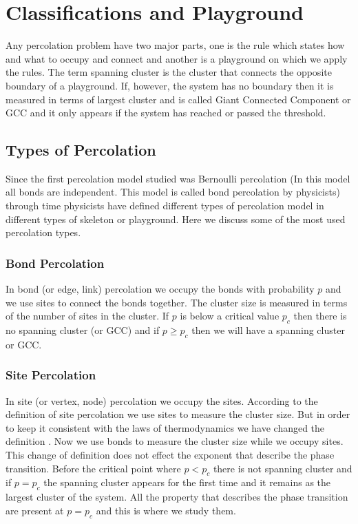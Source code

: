 \section{Classifications and Playground}
	Any percolation problem have two major parts, one is the rule which states how and what to occupy and connect and another is a playground on which we apply the rules. The term spanning cluster is the cluster that connects the opposite boundary of a playground. If, however, the system has no boundary then it is measured in terms of largest cluster and is called Giant Connected Component or GCC and it only appears if the system has reached or passed the threshold. 
		
	\subsection{Types of Percolation}
		Since the first percolation model studied was Bernoulli percolation (In this model all bonds are independent. This model is called bond percolation by physicists) through time physicists have defined different types of percolation model in different types of skeleton or playground. Here we discuss some of the most used percolation types.
		
		\subsubsection{Bond Percolation}
			In bond (or edge, link) percolation we occupy the bonds with probability $p$ and we use sites to connect the bonds together. The cluster size is measured in terms of the number of sites in the cluster. If $p$ is below a critical value $p_c$ then there is no spanning cluster (or GCC) and if $p \geq p_c$ then we will have a spanning cluster or GCC.
			
			
		\subsubsection{Site Percolation}
			In site (or vertex, node) percolation we occupy the sites. According to the definition of site percolation we use sites to measure the cluster size. But in order to keep it consistent with the laws of thermodynamics we have changed the definition \cite{redefinition-of-site-percolation}. Now we use bonds to measure the cluster size while we occupy sites. This change of definition does not effect the exponent that describe the phase transition. Before the critical point where $p<p_c$ there is not spanning cluster and if $p=p_c$ the spanning cluster appears for the first time and it remains as the largest cluster of the system. All the property that describes the phase transition are present at $p=p_c$ and this is where we study them.


